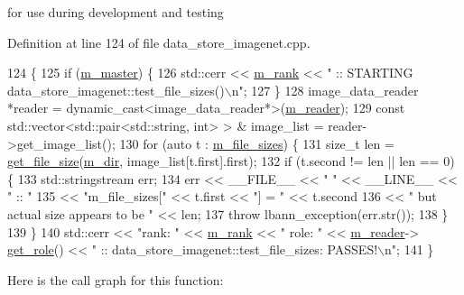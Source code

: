 for use during development and testing 



Definition at line 124 of file data\+\_\+store\+\_\+imagenet.\+cpp.


\begin{DoxyCode}
124                                           \{
125   \textcolor{keywordflow}{if} (\hyperlink{classlbann_1_1generic__data__store_a143fd33ef3a53180bc62745e369c16f8}{m\_master}) \{
126     std::cerr << \hyperlink{classlbann_1_1generic__data__store_a87695bfd2d1ed0dbe01d99108e3f68b7}{m\_rank} << \textcolor{stringliteral}{" :: STARTING data\_store\_imagenet::test\_file\_sizes()\(\backslash\)n"};
127   \}
128   image\_data\_reader *reader = \textcolor{keyword}{dynamic\_cast<}image\_data\_reader*\textcolor{keyword}{>}(\hyperlink{classlbann_1_1generic__data__store_afa49ced0ab64c632371ea52532a91ec2}{m\_reader});
129   \textcolor{keyword}{const} std::vector<std::pair<std::string, int> > & image\_list = reader->get\_image\_list();
130   \textcolor{keywordflow}{for} (\textcolor{keyword}{auto} t : \hyperlink{classlbann_1_1data__store__image_a1903176a4b305fd42617ea1cb6d997ae}{m\_file\_sizes}) \{
131     \textcolor{keywordtype}{size\_t} len = \hyperlink{classlbann_1_1generic__data__store_a7641d15eba63426acf5071acb8026442}{get\_file\_size}(\hyperlink{classlbann_1_1generic__data__store_ab479c127f00ce550c7433b90e40a5a3d}{m\_dir}, image\_list[t.first].first);
132     \textcolor{keywordflow}{if} (t.second != len || len == 0) \{
133       std::stringstream err;
134       err << \_\_FILE\_\_ << \textcolor{stringliteral}{" "} << \_\_LINE\_\_ << \textcolor{stringliteral}{" :: "}
135           << \textcolor{stringliteral}{"m\_file\_sizes["} << t.first << \textcolor{stringliteral}{"] = "} << t.second
136           << \textcolor{stringliteral}{" but actual size appears to be "} << len;
137       \textcolor{keywordflow}{throw} lbann\_exception(err.str());
138     \}
139   \}
140   std::cerr << \textcolor{stringliteral}{"rank:  "} << \hyperlink{classlbann_1_1generic__data__store_a87695bfd2d1ed0dbe01d99108e3f68b7}{m\_rank} << \textcolor{stringliteral}{" role: "} << \hyperlink{classlbann_1_1generic__data__store_afa49ced0ab64c632371ea52532a91ec2}{m\_reader}->
      \hyperlink{classlbann_1_1generic__data__reader_a92982e1b399f37e2ead5aa440883cba5}{get\_role}() << \textcolor{stringliteral}{" :: data\_store\_imagenet::test\_file\_sizes: PASSES!\(\backslash\)n"};
141 \}
\end{DoxyCode}
Here is the call graph for this function\+:\nopagebreak
